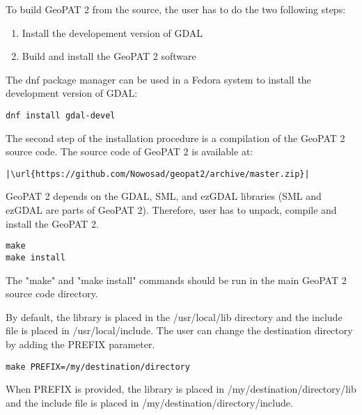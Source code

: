 To build GeoPAT 2 from the source, the user has to do the two following steps:

\begin{enumerate}
    \item{Install the developement version of GDAL}
    \item{Build and install the GeoPAT 2 software}
\end{enumerate}

The dnf package manager can be used in a Fedora system to install the development version of GDAL:

\begin{lstlisting}
dnf install gdal-devel
\end{lstlisting}

The second step of the installation procedure is a compilation of the GeoPAT 2 source code.
The source code of GeoPAT 2 is available at:
\begin{lstlisting}[escapechar=|]
|\url{https://github.com/Nowosad/geopat2/archive/master.zip}|
\end{lstlisting}
GeoPAT 2 depends on the GDAL, SML, and ezGDAL libraries (SML and ezGDAL are parts of GeoPAT 2).
Therefore, user has to unpack, compile and install the GeoPAT 2.
\begin{lstlisting}
make
make install
\end{lstlisting}
The "make" and "make install" commands should be run in the main GeoPAT 2 source code directory.

By default, the library is placed in the /usr/local/lib directory and the include file is placed in /usr/local/include.
The user can change the destination directory by adding the PREFIX parameter.
\begin{lstlisting}
make PREFIX=/my/destination/directory
\end{lstlisting}
When PREFIX is provided, the library is placed in /my/destination/directory/lib and the include file is placed in /my/destination/directory/include.
